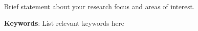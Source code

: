 Brief statement about your research focus and areas of interest.

\textbf{Keywords}: List relevant keywords here
